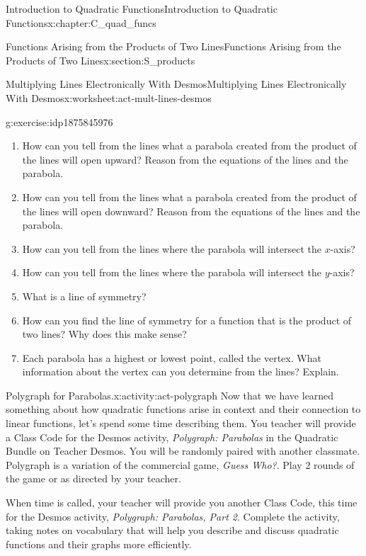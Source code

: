 \documentclass[oneside,10pt,]{book}
\newcommand{\pubtitle}[1]{\textsl{#1}}
\numberwithin{equation}{chapter}
\begin{document}
\begin{chapterptx}{Introduction to Quadratic Functions}{}{Introduction to Quadratic Functions}{}{}{x:chapter:C_quad_funcs}
\begin{sectionptx}{Functions Arising from the Products of Two Lines}{}{Functions Arising from the Products of Two Lines}{}{}{x:section:S_products}
\begin{worksheet-subsection}{Multiplying Lines Electronically With Desmos}{}{Multiplying Lines Electronically With Desmos}{}{}{x:worksheet:act-mult-lines-desmos}
\begin{divisionexercise}{6}{}{}{g:exercise:idp1875845976}
\begin{enumerate}[font=\bfseries,label=(\alph*),ref=\alph*]
\begin{enumerate}[font=\bfseries,label=(\roman*),ref=\theenumi.\roman*]
\item{}Both lines have positive slopes.%
\item{}Both lines have negative slopes. (What additional change do you need to make?)%
\item{}One line has a positive slope and the other line has a negative slope.%
\end{enumerate}
\item{}How can you tell from the lines what a parabola created from the product of the lines will open upward? Reason from the equations of the lines and the parabola.%
\item{}How can you tell from the lines what a parabola created from the product of the lines will open downward? Reason from the equations of the lines and the parabola.%
\item{}How can you tell from the lines where the parabola will intersect the \(x\)-axis?%
\item{}How can you tell from the lines where the parabola will intersect the \(y\)-axis?%
\item{}What is a line of symmetry?%
\item{}How can you find the line of symmetry for a function that is the product of two lines? Why does this make sense?%
\item{}Each parabola has a highest or lowest point, called the vertex. What information about the vertex can you determine from the lines? Explain.%
\end{enumerate}
\end{divisionexercise}%
\end{worksheet-subsection}
\restoregeometry
\begin{activity}{Polygraph for Parabolas.}{x:activity:act-polygraph}%
Now that we have learned something about how quadratic functions arise in context and their connection to linear functions, let's spend some time describing them. You teacher will provide a Class Code for the Desmos activity, \pubtitle{Polygraph: Parabolas} in the Quadratic Bundle on Teacher Desmos. You will be randomly paired with another classmate. Polygraph is a variation of the commercial game, \pubtitle{Guess Who?}. Play 2 rounds of the game or as directed by your teacher.%
\par
When time is called, your teacher will provide you another Class Code, this time for the Desmos activity, \pubtitle{Polygraph: Parabolas, Part 2}. Complete the activity, taking notes on vocabulary that will help you describe and discuss quadratic functions and their graphs more efficiently.%

\end{activity}
\end{sectionptx}
\end{chapterptx}
\end{document}

